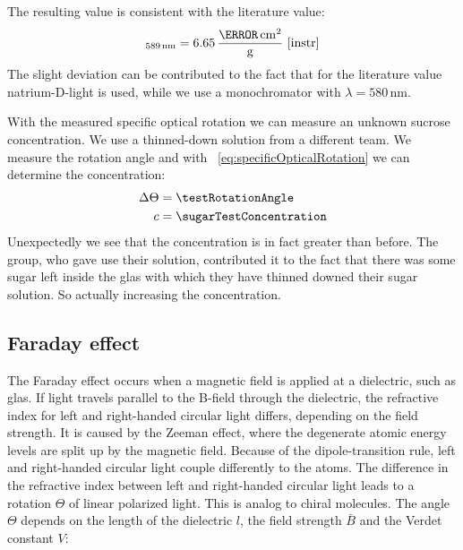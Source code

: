 \documentclass[a4paper,10pt,twocolumn]{article}
\newcommand{\unit}[1]{\, \mathrm{#1}}
\newcommand{\nm}{\unit{nm}}
\newcommand{\unitSpecrot}{\unit{\frac{\degree \, cm^2}{g}}}
\newcommand{\wavelengthYellow}{580 \nm}
\begin{document}
    The resulting value is consistent with the literature value:
    \begin{align*}
        [\alpha]_{589\nm} = 6.65 \unitSpecrot ~\cite{instr}
    \end{align*}
    The slight deviation can be contributed to the fact that for the literature value natrium-D-light
    is used, while we use a monochromator with $\lambda = \wavelengthYellow$.
    
    With the measured specific optical rotation we can measure an unknown sucrose concentration.
    We use a thinned-down solution from a different team.
    We measure the rotation angle and with ~\eqref{eq:specificOpticalRotation} we can determine
    the concentration:
    \begin{align*}
        \Delta \Theta &= \testRotationAngle \\
        c &= \sugarTestConcentration
     \end{align*}
    Unexpectedly we see that the concentration is in fact greater than before.
    The group, who gave use their solution, contributed it to the fact that there was some sugar left
    inside the glas with which they have thinned downed their sugar solution.
    So actually increasing the concentration.

    \subsection{Faraday effect}
    \label{subsec:Faraday}

    \newcommand{\BMean}{\bar{B}}
    \newcommand{\BMax}{B_{\mathrm{max}}}

    The Faraday effect occurs when a magnetic field is applied at a dielectric, such as glas.
    If light travels parallel to the B-field through the dielectric, the refractive index
    for left and right-handed circular light differs, depending on the field strength.
    It is caused by the Zeeman effect, where the degenerate atomic energy levels are split up by the magnetic field.
    Because of the dipole-transition rule, left and right-handed circular light couple differently to the atoms.
    The difference in the refractive index between left and right-handed circular light leads to a rotation
    $\Theta$ of linear polarized light.
    This is analog to chiral molecules.
    The angle $\Theta$ depends on the length of the dielectric $l$, the field strength $\BMean$ and
    the Verdet constant $V$:
\end{document}
